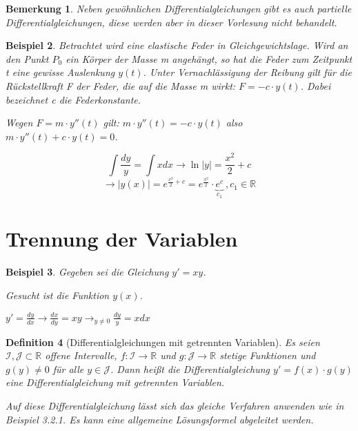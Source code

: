 \documentclass[fontset=ubuntu,12pt,a4paper]{scrreprt}
\newtheorem{defi}{Definition}[section]
\newtheorem{bemerkung}[defi]{Bemerkung}
\newtheorem{beispiel}[defi]{Beispiel}
\begin{document}
    \begin{bemerkung}
        Neben gewöhnlichen Differentialgleichungen gibt es auch partielle Differentialgleichungen, diese werden aber in dieser Vorlesung nicht behandelt.
    \end{bemerkung}

    \begin{beispiel}
        Betrachtet wird eine elastische Feder in Gleichgewichtslage. Wird an den Punkt \(P_0\) ein Körper der Masse m angehängt, so hat die Feder zum Zeitpunkt t eine gewisse Auslenkung \(y(t)\). Unter Vernachlässigung der Reibung gilt für die Rückstellkraft F der Feder, die auf die Masse m wirkt: \(F=-c \cdot y(t)\). Dabei bezeichnet c die Federkonstante.

        Wegen \(F=m \cdot y''(t)\) gilt: \(m \cdot y''(t)=-c \cdot y(t)\) also \(m \cdot y''(t) + c \cdot y(t) = 0\).

        \[\int\frac{dy}{y}=\int xdx \to \ln\left|y\right| = \frac{x^2}{2}+c \]
        \[\to |y(x)| = e^{\frac{x^2}{2}+c}=e^{\frac{x^2}{2}}\cdot \underbrace{e^c}_{c_1}\ ,c_1\in\mathbb{R}\]
    \end{beispiel}

    \section{Trennung der Variablen}
    \begin{beispiel}
        Gegeben sei die Gleichung \(y'=xy\).

        Gesucht ist die Funktion \(y(x)\).

        \(y'=\frac{dy}{dx} \to \frac{dx}{dy}=xy \to_{y \ne 0} \frac{dy}{y}=xdx\)
    \end{beispiel}

    \begin{defi}[Differentialgleichungen mit getrennten Variablen]
        Es seien \\ \(\mathcal{I},\mathcal{J}\subset\mathbb{R}\) offene Intervalle, \(f:\mathcal{I}\to\mathbb{R}\) und \(g:\mathcal{J}\to\mathbb{R}\) stetige Funktionen und \(g(y)\ne0\) für alle \(y\in\mathcal{J}\). Dann heißt die Differentialgleichung \(y'=f(x)\cdot g(y)\) eine Differentialgleichung mit getrennten Variablen.

        Auf diese Differentialgleichung lässt sich das gleiche Verfahren anwenden wie in Beispiel 3.2.1. Es kann eine allgemeine Lösungsformel abgeleitet werden.
    \end{defi}
\end{document}
